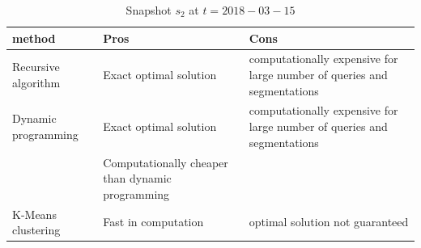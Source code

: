 		\begin{center}
			\begin{table}
				\centering
				\small
				\caption{Snapshot $s_2$ at $t = 2018-03-15$}
				\label{table:segmentation_comparison}
				\begin{tabular}{p{4cm}p{4cm}p{4cm}}
					\hline
					method & Pros  & Cons  \\ \hline
					Recursive algorithm & Exact optimal solution & computationally expensive for large number of queries and segmentations   \\ \hline
					Dynamic programming & Exact optimal solution & computationally expensive for large number of queries and segmentations\\ 
					  & Computationally cheaper than dynamic programming &    \\ \hline
					K-Means clustering & Fast in computation & optimal solution not guaranteed \\ \hline
				\end{tabular}
			\end{table}
		\end{center}